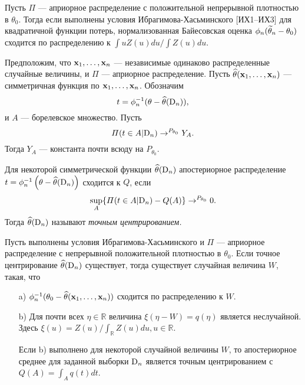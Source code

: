 
\begin{Theorem}
Пусть $\Pi$ --- априорное распределение с положительной непрерывной плотностью в $\theta_0$. 
Тогда если выполнены условия Ибрагимова-Хасьминского [ИХ1--ИХ3] для квадратичной функции потерь, нормализованная Байесовская оценка $\phi_{n} (\widetilde{\theta}_{n} - \theta_0)$ сходится по распределению к $\int u Z(u) du / \int Z(u) du$.
\end{Theorem}

\begin{Proposition}
Предположим, что $\mathbf{x}_1, \ldots, \mathbf{x}_{n}$ --- независимые одинаково распределенные случайные величины, и $\Pi$ --- априорное распределение.
Пусть $\widehat{\theta}(\mathbf{x}_1, \ldots, \mathbf{x}_{n})$ --- симметричная функция по $\mathbf{x}_1, \ldots, \mathbf{x}_{n}$. Обозначим
\[
t = \phi_{n}^{-1} (\theta - \widehat{\theta}(\mathrm{D}_{n})),
\]
и $A$ --- борелевское множество.
Пусть
\[
\varPi(t \in A| \mathrm{D}_{n}) \rightarrow^{P_{\theta_0}} Y_A.
\]
Тогда $Y_A$ --- константа почти всюду на $P_{\theta_0}$.
\end{Proposition}

\begin{Definition}
Для некоторой симметрической функции $\widehat{\theta}(\mathrm{D}_{n})$ апостериорное распределение $t = \phi_{n}^{-1} \left(\theta - \widehat{\theta}(\mathrm{D}_{n}) \right)$ сходится к $Q$, если 
\[
\sup_{A} \{\varPi(t \in A| \mathrm{D}_{n}) - Q(A)\} \rightarrow^{P_{\theta_0}} 0.
\]
Тогда $\widehat{\theta}(\mathrm{D}_{n})$ называют \emph{точным центрированием.}
\end{Definition}

\begin{Theorem}
Пусть выполнены условия Ибрагимова-Хасьминского и $\Pi$ --- априорное распределение с непрерывной положительной плотностью в $\theta_0$. 
Если точное центрирование $\widehat{\theta}(\mathrm{D}_{n})$ существует, тогда существует случайная величина $W\!$, такая, что
\begin{itemize}
\item[a)] $\phi_{n}^{-1}(\theta_0 - \widehat{\theta}(\mathbf{x}_1, \ldots, \mathbf{x}_{n}))$ сходится по распределению к $W$.
\item[b)] Для почти всех $\eta \in \mathbb{R}$ величина $\xi(\eta - W) = q(\eta)$ является неслучайной. Здесь $\xi(u) = Z(u) / \int_{\mathbb{R}} Z(u) du, u \in \mathbb{R}$.

Если b) выполнено для некоторой случайной величины $W$, то апостериорное среднее для заданной выборки $\mathrm{D}_n$ является точным центрированием с $Q(A) = \int_{A} q(t) dt$.
\end{itemize}
\end{Theorem}